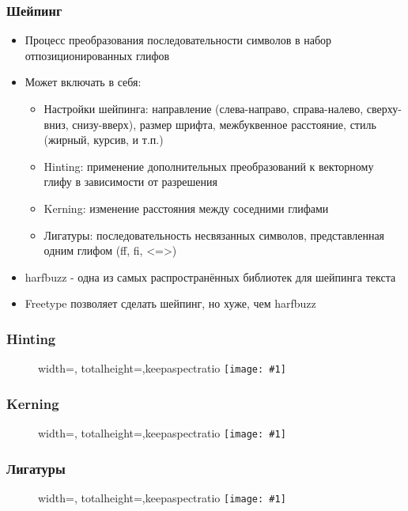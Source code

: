 \documentclass{beamer}
\newcommand{\slideimage}[1]{
  \begin{figure}
    \begin{adjustbox}{width=\textwidth, totalheight=\textheight-2\baselineskip-2\baselineskip,keepaspectratio}
      \texttt{[image: \#1]}
    \end{adjustbox}
  \end{figure}
}
\begin{document}
\begin{frame}[fragile]
\frametitle{Шейпинг}
\begin{itemize}
\item Процесс преобразования последовательности символов в набор отпозиционированных глифов
\pause
\item Может включать в себя:
\pause
\begin{itemize}
\item Настройки шейпинга: направление (слева-направо, справа-налево, сверху-вниз, снизу-вверх), размер шрифта, межбуквенное расстояние, стиль (жирный, курсив, и т.п.)
\pause
\item Hinting: применение дополнительных преобразований к векторному глифу в зависимости от разрешения
\pause
\item Kerning: изменение расстояния между соседними глифами
\pause
\item Лигатуры: последовательность несвязанных символов, представленная одним глифом (ff, fi, <=>)
\end{itemize}
\pause
\item harfbuzz - одна из самых распространённых библиотек для шейпинга текста
\item Freetype позволяет сделать шейпинг, но хуже, чем harfbuzz
\end{itemize}
\end{frame}

\begin{frame}[fragile]
\frametitle{Hinting}
\slideimage{hinting.png}
\end{frame}

\begin{frame}[fragile]
\frametitle{Kerning}
\slideimage{kerning.png}
\end{frame}

\begin{frame}[fragile]
\frametitle{Лигатуры}
\slideimage{ligatures.png}
\end{frame}
\end{document}
